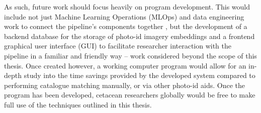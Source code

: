 As such, future work should focus heavily on program development. This would include not just Machine Learning Operations (MLOps) and data engineering work to connect the pipeline's components together \cite{zhou_towards_2020}, but the development of a backend database for the storage of photo-id imagery embeddings and a frontend graphical user interface (GUI) to facilitate researcher interaction with the pipeline in a familiar and friendly way -- work considered beyond the scope of this thesis. Once created however, a working computer program would allow for an in-depth study into the time savings provided by the developed system compared to performing catalogue matching manually, or via other photo-id aids. Once the program has been developed, cetacean researchers globally would be free to make full use of the techniques outlined in this thesis. 


